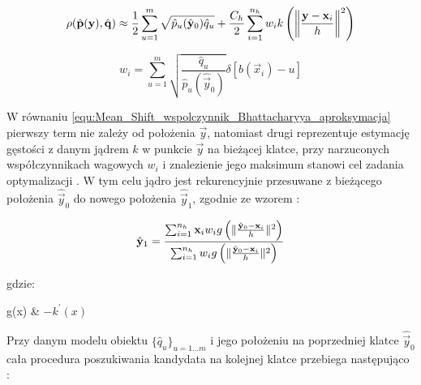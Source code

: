 \begin{equation}
\label{equ:Mean_Shift_wspolczynnik_Bhattacharyya_aproksymacja}
	\rho(\hat{\vec{p}}(\vec{y}), \hat{\vec{q}}) \approx \frac{1}{2}\sum_{u=1}^m \sqrt{\hat{p}_u(\hat{\vec{y}}_0) \hat{q}_u} + \frac{C_h}{2} \sum_{i=1}^{n_h} w_i k\left(\norm[\bigg]{\frac{\vec{y} - \vec{x}_i}{h}}^2\right)
\end{equation}

\begin{equation}
\label{equ:Mean_Shift_wagi}
	w_i = \sum_{u=1}^m \sqrt{\frac{\hat{q}_u}{\hat{p}_u(\hat{\vec{y}}_0)}} \delta[ b(\vec{x}_i) - u]
\end{equation}

W równaniu \ref{equ:Mean_Shift_wspolczynnik_Bhattacharyya_aproksymacja} pierwszy term nie zależy od położenia $\vec{y}$, natomiast drugi reprezentuje estymację gęstości z danym jądrem $k$ w punkcie $\vec{y}$ na bieżącej klatce, przy narzuconych współczynnikach wagowych $w_i$ i znalezienie jego maksimum stanowi cel zadania optymalizacji \cite{Comaniciu2003}. W tym celu jądro jest rekurencyjnie przesuwane z bieżącego położenia $\hat{\vec{y}}_0$ do nowego położenia $\hat{\vec{y}}_1$, zgodnie ze wzorem \cite{Comaniciu2003}:

\begin{equation}
\label{equ:Mean_Shift_przesunięcie}
	\hat{\vec{y}}_1 = \frac{\sum_{i=1}^{n_h} \vec{x}_i w_i g\left( \norm{\frac{\hat{\vec{y}}_0 - \vec{x}_i}{h}}^2 \right)}{\sum_{i=1}^{n_h} w_i g\left( \norm{\frac{\hat{\vec{y}}_0 - \vec{x}_i}{h}}^2 \right)}
\end{equation}

\noindent
gdzie:

\begin{conditionseq}
	g(x) & $-k^\prime(x)$
\end{conditionseq}

Przy danym modelu obiektu $\{\hat{q}_u\}_{u = 1 \dots m}$ i jego położeniu na poprzedniej klatce $\hat{\vec{y}}_0$ cała procedura poszukiwania kandydata na kolejnej klatce przebiega następująco \cite{Comaniciu2003}:

